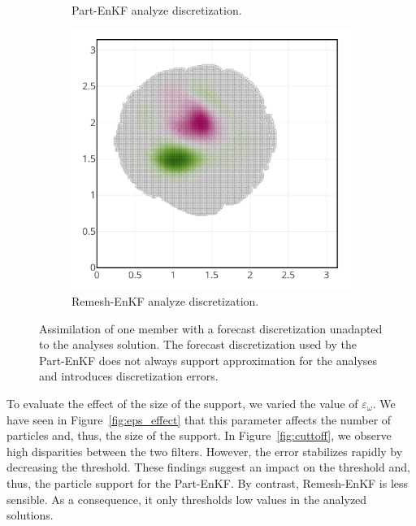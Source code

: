 \begin{figure}[h!]
\begin{subfigure}{0.32\textwidth}
        \caption{Part-EnKF analyze discretization.}
    \end{subfigure}
    \hfill
    \begin{subfigure}{0.32\textwidth}
        \centering
        \includegraphics[width=\linewidth]{./images/app2d/assim_member_rmf.png}
        \caption{Remesh-EnKF analyze discretization.}
    \end{subfigure}
    \caption{Assimilation of one member with a forecast discretization unadapted to the analyses solution. The forecast discretization used by the Part-EnKF does not always support approximation for the analyses and introduces discretization errors.}
    \label{fig:assim_member}
\end{figure}

To evaluate the effect of the size of the support, we varied the value of $\varepsilon_{\omega}$. We have seen in Figure~\ref{fig:eps_effect} that this parameter affects the number of particles and, thus, the size of the support. In Figure~\ref{fig:cuttoff}, we observe high disparities between the two filters. However, the error stabilizes rapidly by decreasing the threshold. These findings suggest an impact on the threshold and, thus, the particle support for the Part-EnKF. By contrast, Remesh-EnKF is less sensible. As a consequence, it only thresholds low values in the analyzed solutions.


